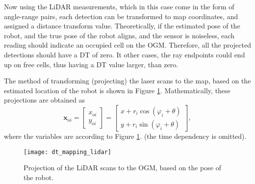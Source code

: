 Now using the LiDAR measurements, which in this case come in the form of angle-range pairs,
each detection can be transformed to map coordinates, and assigned a distance transform value.
Theoretically, if the estimated pose of the robot, and the true pose of the robot aligns,
and the sensor is noiseless, each reading should indicate an occupied cell on the OGM.
Therefore, all the projected detections should have a DT of zero.
It other cases, the ray endpoints could end up on free cells, thus having a DT value larger,
than zero.

The method of transforming (projecting) the laser scans to the map, based on the estimated
location of the robot is shown in Figure \ref{fig:ogm-laser-projection}.
Mathematically, these projections are obtained as
\begin{equation}
    \mathbf{x}_{\mathrm{o}i} = \begin{bmatrix}x_{\mathrm{o}i}\\y_{\mathrm{o}i}\end{bmatrix}
    = \begin{bmatrix}x + r_i\cos(\varphi_i + \theta)\\y + r_i\sin(\varphi_i + \theta)\end{bmatrix},
\end{equation}
where the variables are according to Figure \ref{fig:ogm-laser-projection}. (the time dependency is omitted).
\begin{figure}[htbp]
    \centering
    \texttt{[image: dt\_mapping\_lidar]}
    \caption{Projection of the LiDAR scans to the OGM, based on the pose of the robot.}
    \label{fig:ogm-laser-projection}
\end{figure}

